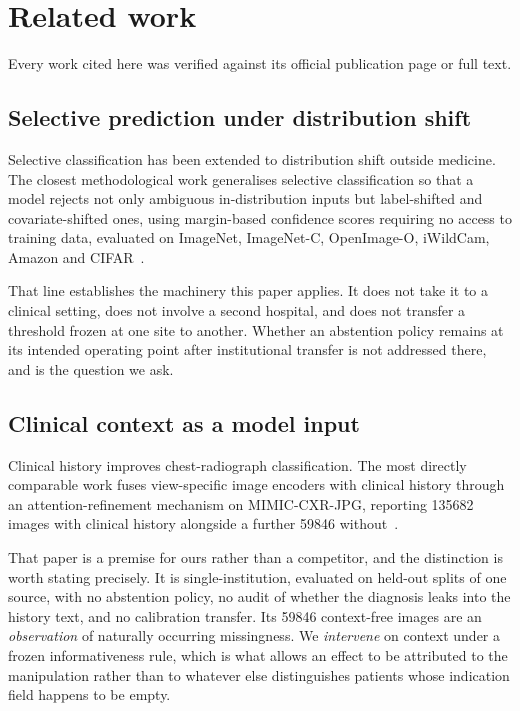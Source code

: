 \section{Related work}
\label{sec:related-work}

Every work cited here was verified against its official publication page or
full text.

\subsection{Selective prediction under distribution shift}

Selective classification has been extended to distribution shift outside
medicine. The closest methodological work generalises selective classification
so that a model rejects not only ambiguous in-distribution inputs but
label-shifted and covariate-shifted ones, using margin-based confidence scores
requiring no access to training data, evaluated on ImageNet, ImageNet-C,
OpenImage-O, iWildCam, Amazon and CIFAR~\cite{selective_shift_2025}.

That line establishes the machinery this paper applies. It does not take it to a
clinical setting, does not involve a second hospital, and does not transfer a
threshold frozen at one site to another. Whether an abstention policy remains at
its intended operating point after institutional transfer is not addressed
there, and is the question we ask.

\subsection{Clinical context as a model input}
\label{sec:rw-context}

Clinical history improves chest-radiograph classification. The most directly
comparable work fuses view-specific image encoders with clinical history through
an attention-refinement mechanism on MIMIC-CXR-JPG, reporting
\num{135682} images with clinical history alongside a further \num{59846}
without~\cite{yang2025mcxnet}.

That paper is a premise for ours rather than a competitor, and the distinction
is worth stating precisely. It is single-institution, evaluated on held-out
splits of one source, with no abstention policy, no audit of whether the
diagnosis leaks into the history text, and no calibration transfer. Its
\num{59846} context-free images are an \emph{observation} of naturally occurring
missingness. We \emph{intervene} on context under a frozen informativeness rule,
which is what allows an effect to be attributed to the manipulation rather than
to whatever else distinguishes patients whose indication field happens to be
empty.

